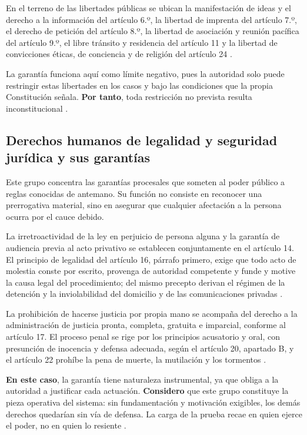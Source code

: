 \documentclass[
  spanish,
  letterpaper, oneside
]{article}
\begin{document}
En el terreno de las libertades públicas se ubican la manifestación de ideas y el derecho a la información del artículo 6.º, la libertad de imprenta del artículo 7.º, el derecho de petición del artículo 8.º, la libertad de asociación y reunión pacífica del artículo 9.º, el libre tránsito y residencia del artículo 11 y la libertad de convicciones éticas, de conciencia y de religión del artículo 24 \citep{cpeum2026}.

La garantía funciona aquí como límite negativo, pues la autoridad solo puede restringir estas libertades en los casos y bajo las condiciones que la propia Constitución señala. \textbf{Por tanto}, toda restricción no prevista resulta inconstitucional \citep{cndhCualesDerechos2026}.

\subsection{Derechos humanos de legalidad y seguridad jurídica y sus garantías}

Este grupo concentra las garantías procesales que someten al poder público a reglas conocidas de antemano. Su función no consiste en reconocer una prerrogativa material, sino en asegurar que cualquier afectación a la persona ocurra por el cauce debido.

La irretroactividad de la ley en perjuicio de persona alguna y la garantía de audiencia previa al acto privativo se establecen conjuntamente en el artículo 14. El principio de legalidad del artículo 16, párrafo primero, exige que todo acto de molestia conste por escrito, provenga de autoridad competente y funde y motive la causa legal del procedimiento; del mismo precepto derivan el régimen de la detención y la inviolabilidad del domicilio y de las comunicaciones privadas \citep{cpeum2026}.

La prohibición de hacerse justicia por propia mano se acompaña del derecho a la administración de justicia pronta, completa, gratuita e imparcial, conforme al artículo 17. El proceso penal se rige por los principios acusatorio y oral, con presunción de inocencia y defensa adecuada, según el artículo 20, apartado B, y el artículo 22 prohíbe la pena de muerte, la mutilación y los tormentos \citep{cpeum2026}.

\textbf{En este caso}, la garantía tiene naturaleza instrumental, ya que obliga a la autoridad a justificar cada actuación. \textbf{Considero} que este grupo constituye la pieza operativa del sistema: sin fundamentación y motivación exigibles, los demás derechos quedarían sin vía de defensa. La carga de la prueba recae en quien ejerce el poder, no en quien lo resiente \citep{cndhInehrmConstitucionDH2015}.
\end{document}
